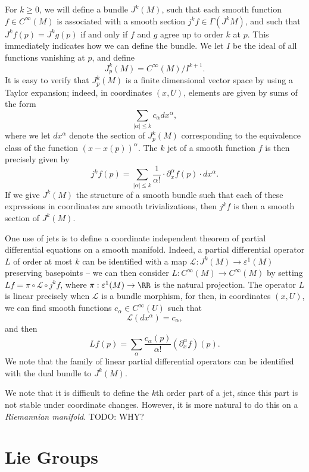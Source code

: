 For $k \geq 0$, we will define a bundle $J^k(M)$, such that each smooth function $f \in C^\infty(M)$ is associated with a smooth section $j^k f \in \Gamma(J^k M)$, and such that $J^k f(p) = J^k g(p)$ if and only if $f$ and $g$ agree up to order $k$ at $p$. This immediately indicates how we can define the bundle. We let $I$ be the ideal of all functions vanishing at $p$, and define
%
\[ J^k_p(M) = C^\infty(M) / I^{k+1}. \]
%
It is easy to verify that $J^k_p(M)$ is a finite dimensional vector space by using a Taylor expansion; indeed, in coordinates $(x,U)$, elements are given by sums of the form
%
\[ \sum_{|\alpha| \leq k} c_\alpha dx^\alpha, \]
%
where we let $dx^\alpha$ denote the section of $J^k_p(M)$ corresponding to the equivalence class of the function $(x - x(p))^\alpha$. The $k$ jet of a smooth function $f$ is then precisely given by
%
\[ j^k f(p) = \sum_{|\alpha| \leq k} \frac{1}{\alpha!} \cdot \partial_x^\alpha f(p) \cdot dx^\alpha. \]
%
If we give $J^k(M)$ the structure of a smooth bundle such that each of these expressions in coordinates are smooth trivializations, then $j^k f$ is then a smooth section of $J^k(M)$.

One use of jets is to define a coordinate independent theorem of partial differential equations on a smooth manifold. Indeed, a partial differential operator $L$ of order at most $k$ can be identified with a map $\mathcal{L}: J^k(M) \to \varepsilon^1(M)$ preserving basepoints -- we can then consider $L: C^\infty(M) \to C^\infty(M)$ by setting $Lf = \pi \circ \mathcal{L} \circ j^k f$, where $\pi: \varepsilon^1(M) \to \RR$ is the natural projection. The operator $L$ is linear precisely when $\mathcal{L}$ is a bundle morphism, for then, in coordinates $(x,U)$, we can find smooth functions $c_\alpha \in C^\infty(U)$ such that
%
\[ \mathcal{L}(dx^\alpha) = c_\alpha, \]
%
and then
%
\[ Lf(p) = \sum_\alpha \frac{c_\alpha(p)}{\alpha!} (\partial_x^\alpha f)(p). \]
%
We note that the family of linear partial differential operators can be identified with the dual bundle to $J^k(M)$.

We note that it is difficult to define the $k$th order part of a jet, since this part is not stable under coordinate changes. However, it is more natural to do this on a \emph{Riemannian manifold}. TODO: WHY?








\chapter{Lie Groups}

